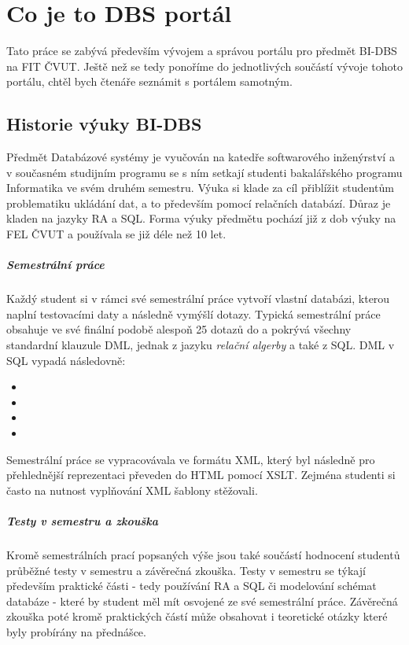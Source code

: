 \chapter{Co je to DBS portál} \label{DBSportal}

Tato práce se zabývá především vývojem a správou portálu pro předmět BI-DBS na FIT ČVUT. Ještě než se tedy ponoříme do jednotlivých součástí vývoje tohoto portálu, chtěl bych čtenáře seznámit s portálem samotným.

\section{Historie výuky BI-DBS}

Předmět Databázové systémy je vyučován na katedře softwarového inženýrství a v současném studijním programu se s ním setkají studenti bakalářského programu Informatika ve svém druhém semestru. Výuka si klade za cíl přiblížit studentům problematiku ukládání dat, a to především pomocí relačních databází. Důraz je kladen na jazyky RA a SQL. Forma výuky předmětu pochází již z dob výuky na FEL ČVUT a používala se již déle než 10 let.

\paragraph{Semestrální práce}
Každý student si v rámci své semestrální práce vytvoří vlastní databázi, kterou naplní testovacími daty a následně vymýšlí dotazy. Typická semestrální práce obsahuje ve své finální podobě alespoň 25 dotazů do a pokrývá všechny standardní klauzule DML, jednak z jazyku \emph{relační algerby} a také z SQL. DML v SQL vypadá následovně:
\begin{itemize}
	\item {}
	\item {}
	\item {}
	\item {}
\end{itemize}
Semestrální práce se vypracovávala ve formátu XML, který byl následně pro přehlednější reprezentaci převeden do HTML pomocí XSLT. Zejména studenti si často na nutnost vyplňování XML šablony stěžovali.

\paragraph{Testy v semestru a zkouška}
Kromě semestrálních prací popsaných výše jsou také součástí hodnocení studentů průběžné testy v semestru a závěrečná zkouška. Testy v semestru se týkají především praktické části - tedy používání RA a SQL či modelování schémat databáze - které by student měl mít osvojené ze své semestrální práce. Závěrečná zkouška poté kromě praktických částí může obsahovat i teoretické otázky které byly probírány na přednášce.

